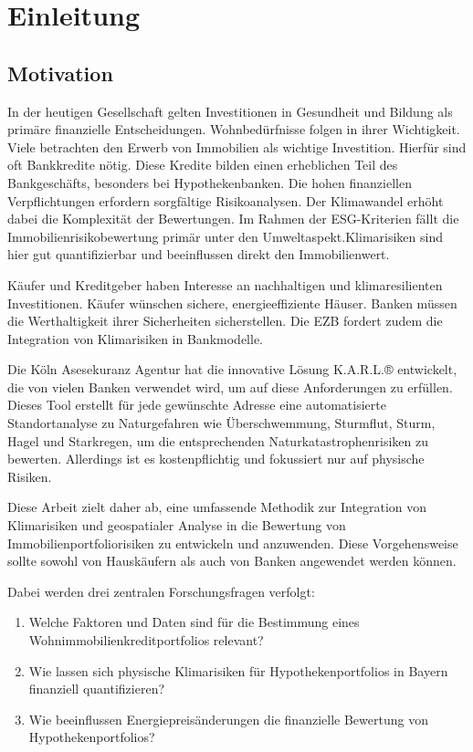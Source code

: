 \section{Einleitung}\label{kap:1}
\subsection{Motivation}

In der heutigen Gesellschaft gelten Investitionen in Gesundheit und Bildung als primäre finanzielle Entscheidungen. Wohnbedürfnisse folgen in ihrer Wichtigkeit. Viele betrachten den Erwerb von Immobilien als wichtige Investition. Hierfür sind oft Bankkredite nötig.
Diese Kredite bilden einen erheblichen Teil des Bankgeschäfts, besonders bei Hypothekenbanken. Die hohen finanziellen Verpflichtungen erfordern sorgfältige Risikoanalysen. Der Klimawandel erhöht dabei die Komplexität der Bewertungen. Im Rahmen der \ac{ESG}-Kriterien fällt die Immobilienrisikobewertung primär unter den Umweltaspekt.Klimarisiken sind hier gut quantifizierbar und beeinflussen direkt den Immobilienwert. 

Käufer und Kreditgeber haben Interesse an nachhaltigen und klimaresilienten Investitionen. Käufer wünschen sichere, energieeffiziente Häuser. Banken müssen die Werthaltigkeit ihrer Sicherheiten sicherstellen. Die EZB fordert zudem die Integration von Klimarisiken in Bankmodelle.

Die Köln Asesekuranz Agentur hat die innovative Lösung K.A.R.L.® entwickelt, die von vielen Banken verwendet wird, um auf diese Anforderungen zu erfüllen. Dieses Tool erstellt für jede gewünschte Adresse eine automatisierte Standortanalyse zu Naturgefahren wie Überschwemmung, Sturmflut, Sturm, Hagel und Starkregen, um die entsprechenden Naturkatastrophenrisiken zu bewerten. Allerdings ist es kostenpflichtig und fokussiert nur auf physische Risiken.

Diese Arbeit zielt daher ab, eine umfassende Methodik zur Integration von Klimarisiken und geospatialer Analyse in die Bewertung von Immobilienportfoliorisiken zu entwickeln und anzuwenden. Diese Vorgehensweise sollte sowohl von Hauskäufern als auch von Banken angewendet werden können.

Dabei werden drei zentralen Forschungsfragen verfolgt:

\begin{enumerate}
    \item Welche Faktoren und Daten sind für die Bestimmung eines Wohnimmobilienkreditportfolios relevant?
    \item Wie lassen sich physische Klimarisiken für Hypothekenportfolios in Bayern finanziell quantifizieren?
    \item Wie beeinflussen Energiepreisänderungen die finanzielle Bewertung von Hypothekenportfolios?
    \end{enumerate}

